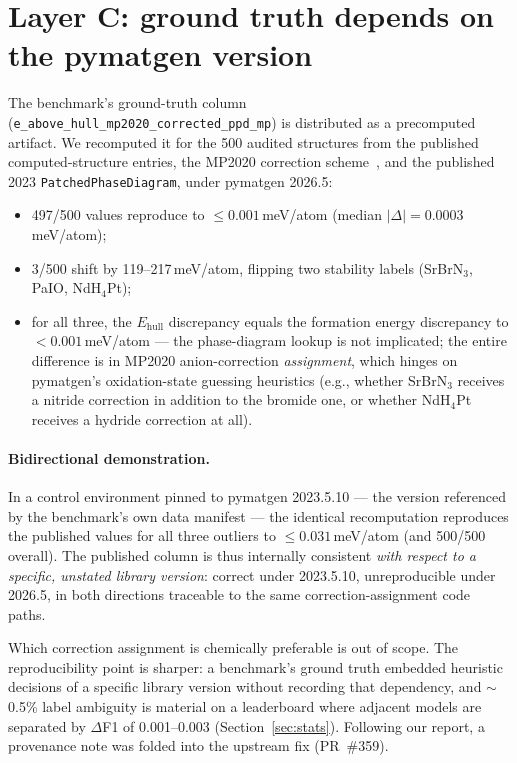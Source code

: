 \documentclass[11pt]{article}
\newcommand{\code}[1]{\texttt{#1}}
\newcommand{\meV}{\,meV/atom}
\begin{document}
\section{Layer C: ground truth depends on the pymatgen version}
\label{sec:gt}

The benchmark's ground-truth column
(\code{e\_above\_hull\_mp2020\_corrected\_ppd\_mp}) is distributed as a
precomputed artifact. We recomputed it for the 500 audited structures from the
published computed-structure entries, the MP2020 correction
scheme~\cite{wang2021corrections}, and the published 2023
\code{PatchedPhaseDiagram}, under pymatgen 2026.5:

\begin{itemize}
\item 497/500 values reproduce to $\le 0.001$\meV{} (median
$|\Delta| = 0.0003$\meV);
\item 3/500 shift by 119--217\meV, flipping two stability labels
(SrBrN$_3$, PaIO, NdH$_4$Pt);
\item for all three, the $E_\mathrm{hull}$ discrepancy equals the formation
energy discrepancy to $<0.001$\meV{} --- the phase-diagram lookup is not
implicated; the entire difference is in MP2020 anion-correction
\emph{assignment}, which hinges on pymatgen's oxidation-state guessing
heuristics (e.g., whether SrBrN$_3$ receives a nitride correction in addition
to the bromide one, or whether NdH$_4$Pt receives a hydride correction at
all).
\end{itemize}

\paragraph{Bidirectional demonstration.} In a control environment pinned to
pymatgen 2023.5.10 --- the version referenced by the benchmark's own data
manifest --- the identical recomputation reproduces the published values for
all three outliers to $\le 0.031$\meV{} (and 500/500 overall). The published
column is thus internally consistent \emph{with respect to a specific,
unstated library version}: correct under 2023.5.10, unreproducible under
2026.5, in both directions traceable to the same correction-assignment code
paths.

Which correction assignment is chemically preferable is out of scope. The
reproducibility point is sharper: a benchmark's ground truth embedded
heuristic decisions of a specific library version without recording that
dependency, and $\sim$0.5\% label ambiguity is material on a leaderboard
where adjacent models are separated by $\Delta$F1 of 0.001--0.003
(Section~\ref{sec:stats}). Following our report, a provenance note was folded
into the upstream fix (PR~\#359).
\end{document}

